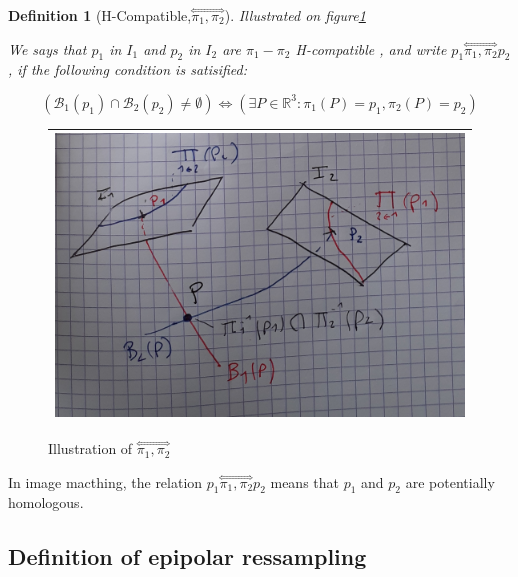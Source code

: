 \documentclass[a4paper]{article}
\newcommand{\RR}{\ensuremath{\mathbb{R}}}
\newcommand{\HComp}{\overset{\Longleftrightarrow}{\scriptscriptstyle \pi_1,\pi_2}}
\newcommand{\Bund}[1]{\ensuremath{\mathcal{B}_{#1}}}
\newcommand{\BundO}{\Bund{1}}
\newcommand{\BundT}{\Bund{2}}
\newtheorem{definition}{Definition}
\begin{document}
\begin{definition}[H-Compatible,$\HComp$] 
\emph{Illustrated on figure\ref{FigNotaComp}}

We says that $p_1$ in  $I_1$ and $p_2$ in $I_2$ are  $\pi_1-\pi_2$ H-compatible , and write $p_1 \HComp p_2$, if   the following condition is satisified:

\begin{equation}
   ( \BundO(p_1) \cap  \BundT(p_2) \neq \emptyset    )
    \Leftrightarrow
  (\exists P \in  \RR^3 : \pi_1(P) =p_1 ,  \pi_2(P) = p_2)
\end{equation}
\end{definition}

\begin{figure}
\centering
\begin{tabular}{||c||}
 \hline \hline
\includegraphics[width=15cm]{FIGS/NotaBundle.jpg} 
 \\ \hline \hline
\end{tabular}
\caption{Illustration of $\HComp$}
\label{FigNotaComp}
\end{figure}

In image macthing, the relation $p_1 \HComp p_2$  means that $p_1$ and $p_2$ are potentially homologous.




\subsection{Definition of epipolar ressampling}
\end{document}

